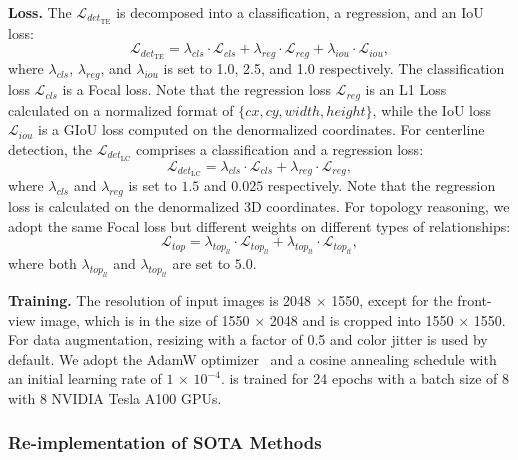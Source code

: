 \smallskip
\noindent
\textbf{Loss.}
The $\mathcal{L}_{det_{\text{TE}}}$ is decomposed into a classification, a regression, and an IoU loss:
\begin{equation}
    \mathcal{L}_{det_{\text{TE}}} = \lambda_{cls} \cdot \mathcal{L}_{cls} + \lambda_{reg} \cdot \mathcal{L}_{reg} + \lambda_{iou} \cdot \mathcal{L}_{iou},
\end{equation}
where $\lambda_{cls}$, $\lambda_{reg}$, and $\lambda_{iou}$ is set to 1.0, 2.5, and 1.0 respectively. 
The classification loss $\mathcal{L}_{cls}$ is a Focal loss.
Note that the regression loss $\mathcal{L}_{reg}$ is an L1 Loss calculated on a normalized format of $\{cx, cy, width, height\}$, while the IoU loss $\mathcal{L}_{iou}$ is a GIoU loss computed on the denormalized coordinates.
For centerline detection, the $\mathcal{L}_{det_{\text{LC}}}$ comprises a classification and a regression loss:
\begin{equation}
    \mathcal{L}_{det_{\text{LC}}} = \lambda_{cls} \cdot \mathcal{L}_{cls} + \lambda_{reg} \cdot \mathcal{L}_{reg},
\end{equation}
where $\lambda_{cls}$ and $\lambda_{reg}$ is set to $1.5$ and $0.025$ respectively. 
Note that the regression loss is calculated on the denormalized 3D coordinates.
For topology reasoning, we adopt the same Focal loss but different weights on different types of relationships:
\begin{equation}
    \mathcal{L}_{top} = \lambda_{top_{ll}} \cdot \mathcal{L}_{top_{ll}} + \lambda_{top_{lt}} \cdot \mathcal{L}_{top_{lt}},
\end{equation}
where both $\lambda_{top_{ll}}$ and $\lambda_{top_{lt}}$ are set to $5.0$. 



\smallskip
\noindent
\textbf{Training.}
The resolution of input images is 2048 $\times$ 1550, except for the front-view image, which is in the size of 1550 $\times$ 2048 and is cropped into 1550 $\times$ 1550.
For data augmentation, resizing with a factor of 0.5 and color jitter is used by default.
We adopt the AdamW optimizer~\cite{adamw} and a cosine annealing schedule with an initial learning rate of $1\,\times\,10^{-4}$. \algname is trained for 24 epochs with a batch size of 8 with 8 NVIDIA Tesla A100 GPUs.


\subsubsection{Re-implementation of SOTA Methods}

